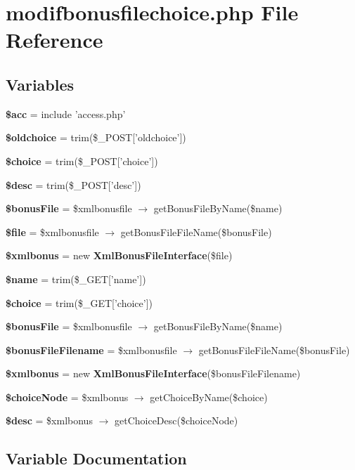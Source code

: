 \section{modifbonusfilechoice.php File Reference}
\label{modifbonusfilechoice_8php}


\subsection*{Variables}
\begin{CompactItemize}
\item 
{\bf \$acc} = include 'access.php'
\item 
{\bf \$oldchoice} = trim(\$\_\-POST['oldchoice'])
\item 
{\bf \$choice} = trim(\$\_\-POST['choice'])
\item 
{\bf \$desc} = trim(\$\_\-POST['desc'])
\item 
{\bf \$bonus\-File} = \$xmlbonusfile $\rightarrow$ get\-Bonus\-File\-By\-Name(\$name)
\item 
{\bf \$file} = \$xmlbonusfile $\rightarrow$ get\-Bonus\-File\-File\-Name(\$bonus\-File)
\item 
{\bf \$xmlbonus} = new {\bf Xml\-Bonus\-File\-Interface}(\$file)
\item 
{\bf \$name} = trim(\$\_\-GET['name'])
\item 
{\bf \$choice} = trim(\$\_\-GET['choice'])
\item 
{\bf \$bonus\-File} = \$xmlbonusfile $\rightarrow$ get\-Bonus\-File\-By\-Name(\$name)
\item 
{\bf \$bonus\-File\-Filename} = \$xmlbonusfile $\rightarrow$ get\-Bonus\-File\-File\-Name(\$bonus\-File)
\item 
{\bf \$xmlbonus} = new {\bf Xml\-Bonus\-File\-Interface}(\$bonus\-File\-Filename)
\item 
{\bf \$choice\-Node} = \$xmlbonus $\rightarrow$ get\-Choice\-By\-Name(\$choice)
\item 
{\bf \$desc} = \$xmlbonus $\rightarrow$ get\-Choice\-Desc(\$choice\-Node)
\end{CompactItemize}


\subsection{Variable Documentation}

